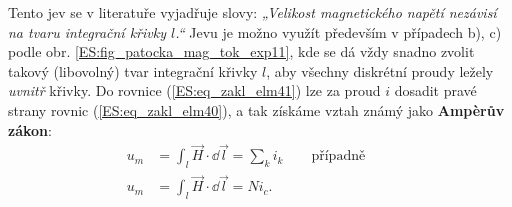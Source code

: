         Tento jev se v literatuře vyjadřuje slovy: \emph{„Velikost magnetického napětí nezávisí na 
        tvaru integrační křivky \(l\).“} Jevu je možno využít především v případech b), c) podle 
        obr. \ref{ES:fig_patocka_mag_tok_exp11}, kde se dá vždy snadno zvolit takový (libovolný) 
        tvar integrační křivky \(l\), aby všechny diskrétní proudy ležely \emph{uvnitř} křivky. Do 
        rovnice (\ref{ES:eq_zakl_elm41}) lze za proud \(i\) dosadit pravé strany rovnic 
        (\ref{ES:eq_zakl_elm40}), a tak získáme vztah známý jako \textbf{Ampèrův zákon}:
        \begin{align}
          u_m &= \int_l \vec{H}\cdot \dd{\vec{l}} =\sum_k i_k 
          \qquad\text{případně}\qquad                                \nonumber \\
          u_m &= \int_l \vec{H}\cdot \dd{\vec{l}} =Ni_c.                 \label{ES:eq_zakl_elm42}
        \end{align}
     
